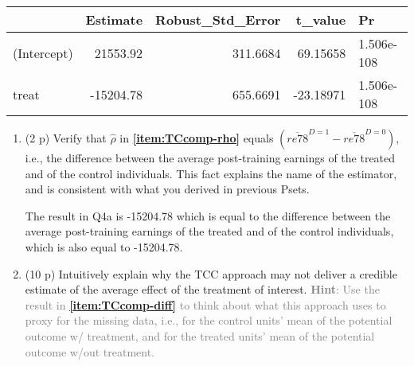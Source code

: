 \documentclass[
]{article}
\newenvironment{Shaded}{\begin{snugshade}}{\end{snugshade}}
\newcommand{\DecValTok}[1]{\textcolor[rgb]{0.00,0.00,0.81}{#1}}
\newcommand{\FunctionTok}[1]{\textcolor[rgb]{0.13,0.29,0.53}{\textbf{#1}}}
\newcommand{\NormalTok}[1]{#1}
\newcommand{\OtherTok}[1]{\textcolor[rgb]{0.56,0.35,0.01}{#1}}
\newcommand{\SpecialCharTok}[1]{\textcolor[rgb]{0.81,0.36,0.00}{\textbf{#1}}}
\begin{document}
\begin{enumerate}
  \begin{longtable}[]{@{}lrrrl@{}}
  \toprule\noalign{}
  & Estimate & Robust\_Std\_Error & t\_value & Pr \\
  \midrule\noalign{}
  \endhead
  \bottomrule\noalign{}
  \endlastfoot
  (Intercept) & 21553.92 & 311.6684 & 69.15658 & 1.506e-108 \\
  treat & -15204.78 & 655.6691 & -23.18971 & 1.506e-108 \\
  \end{longtable}

  \begin{enumerate}
  \def\labelenumii{\alph{enumii}.}
  \setcounter{enumii}{2}
  \item
    (2 p) Verify that \(\hat{\rho}\) in \textbf{\ref{item:TCcomp-rho}}
    equals \((\overline{re78}^{D=1}-\overline{re78}^{D=0})\), i.e., the
    difference between the average post-training earnings of the treated
    and of the control individuals. This fact explains the name of the
    estimator, and is consistent with what you derived in previous
    Psets.\label{item:TCcomp-diff}

\begin{Shaded}
\end{Shaded}

    The result in Q4a is -15204.78 which is equal to the difference
    between the average post-training earnings of the treated and of the
    control individuals, which is also equal to -15204.78.
  \item
    (10 p) Intuitively explain why the TCC approach may not deliver a
    credible estimate of the average effect of the treatment of
    interest.
    \textcolor{gray}{\textbf{Hint}: Use the result in  \textbf{\ref{item:TCcomp-diff}} to think about what this approach uses to proxy for the missing data, i.e., for the control units' mean of the potential outcome w/ treatment, and for the treated units' mean of the potential outcome w/out treatment.}\label{item:TCcomp-rho}


\end{enumerate}
\end{enumerate}
\end{document}
